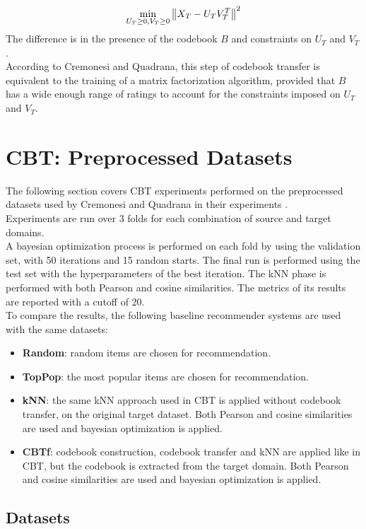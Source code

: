 \begin{equation*}
\min_{U_T \geq 0, V_T \geq 0} \left\lVert X_T - U_T V_T^T\right\rVert^2
\end{equation*}
The difference is in the presence of the codebook $B$ and constraints on $U_T$ and $V_T$.\\
According to Cremonesi and Quadrana, this step of codebook transfer is equivalent to the training of a matrix factorization algorithm, provided that $B$ has a wide enough range of ratings to account for the constraints imposed on $U_T$ and $V_T$.



\section{CBT: Preprocessed Datasets}

The following section covers CBT experiments performed on the preprocessed datasets used by Cremonesi and Quadrana in their experiments \cite{10.1145/2645710.2645769}.\\
Experiments are run over 3 folds for each combination of source and target domains.\\
A bayesian optimization process is performed on each fold by using the validation set, with 50 iterations and 15 random starts. The final run is performed using the test set with the hyperparameters of the best iteration. The kNN phase is performed with both Pearson and cosine similarities. The metrics of its results are reported with a cutoff of 20.\\
To compare the results, the following baseline recommender systems are used with the same datasets:
\begin{itemize}
\item \textbf{Random}: random items are chosen for recommendation.
\item \textbf{TopPop}: the most popular items are chosen for recommendation.
\item \textbf{kNN}: the same kNN approach used in CBT is applied without codebook transfer, on the original target dataset. Both Pearson and cosine similarities are used and bayesian optimization is applied.
\item \textbf{CBTf}: codebook construction, codebook transfer and kNN are applied like in CBT, but the codebook is extracted from the target domain. Both Pearson and cosine similarities are used and bayesian optimization is applied.
\end{itemize}


\subsection{Datasets}

